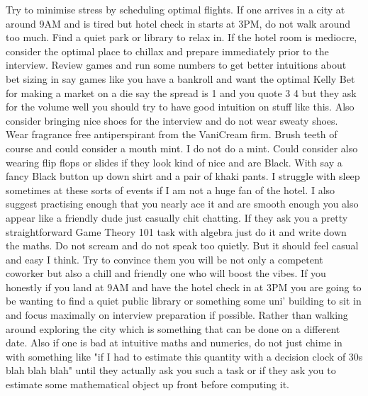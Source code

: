 Try to minimise stress by scheduling optimal flights. If one arrives in a city at around 9AM and is tired but hotel check in starts at 3PM, do not walk around too much. Find a quiet park or library to relax in. If the hotel room is mediocre, consider the optimal place to chillax and prepare immediately prior to the interview. Review games and run some numbers to get better intuitions about bet sizing in say games like you have a bankroll and want the optimal Kelly Bet for making a market on a die say the spread is 1 and you quote 3 4 but they ask for the volume well you should try to have good intuition on stuff like this. Also consider bringing nice shoes for the interview and do not wear sweaty shoes. Wear fragrance free antiperspirant from the VaniCream firm. Brush teeth of course and could consider a mouth mint. I do not do a mint. Could consider also wearing flip flops or slides if they look kind of nice and are Black. With say a fancy Black button up down shirt and a pair of khaki pants. I struggle with sleep sometimes at these sorts of events if I am not a huge fan of the hotel. I also suggest practising enough that you nearly ace it and are smooth enough you also appear like a friendly dude just casually chit chatting. If they ask you a pretty straightforward Game Theory 101 task with algebra just do it and write down the maths. Do not scream and do not speak too quietly. But it should feel casual and easy I think. Try to convince them you will be not only a competent coworker but also a chill and friendly one who will boost the vibes. If you honestly if you land at 9AM and have the hotel check in at 3PM you are going to be wanting to find a quiet public library or something some uni' building to sit in and focus maximally on interview preparation if possible. Rather than walking around exploring the city which is something that can be done on a different date. Also if one is bad at intuitive maths and numerics, do not just chime in with something like "if I had to estimate this quantity with a decision clock of 30s blah blah blah" until they actually ask you such a task or if they ask you to estimate some mathematical object up front before computing it.


